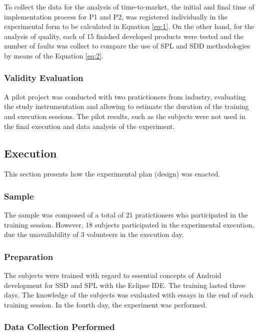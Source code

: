 To collect the data for the analysis of time-to-market, the initial and final time of implementation process for P1 and P2, was registered individually in the experimental form to be calculated in Equation \ref{eq:1}. On the other hand, for the analysis of quality, each of 15 finished developed products were tested and the number of faults was collect to compare the use of SPL and SDD methodologies by means of the Equation \ref{eq:2}.


\subsubsection{Validity Evaluation}

A pilot project was conducted with two pratictioners from industry, evaluating the study instrumentation and allowing to estimate the duration of the training and execution sessions. The pilot results, such as the subjects were not used in the final execution and data analysis of the experiment.


\subsection{Execution}\label{sub:execution}

This section presents how the experimental plan (design) was enacted.

\subsubsection{Sample}

The sample was composed of a total of 21 pratictioners who participated in the training session. However, 18 subjects participated in the experimental execution, due the unavailability of 3 volunteers in the execution day.

\subsubsection{Preparation}

The subjects were trained with regard to essential concepts of Android development for SSD and SPL with the Eclipse IDE. The training lasted three days. The knowledge of the subjects was evaluated with essays in the end of each training session. In the fourth day, the experiment was performed.

\subsubsection{Data Collection Performed}

